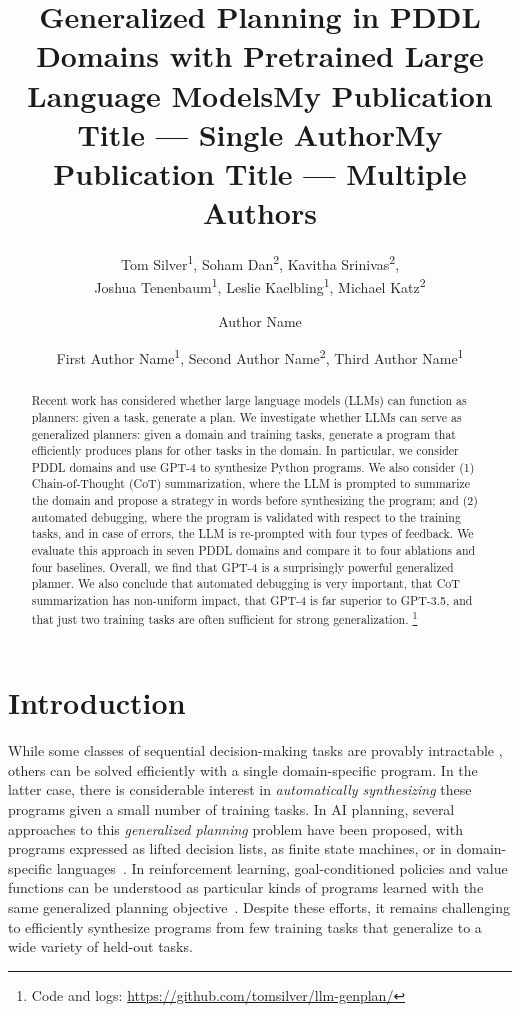 \documentclass[letterpaper]{article} %
\title{Generalized Planning in PDDL Domains with Pretrained Large Language Models}
\author{
    Tom Silver\textsuperscript{\rm 1},
    Soham Dan\textsuperscript{\rm 2},
    Kavitha Srinivas\textsuperscript{\rm 2},\\
    Joshua Tenenbaum\textsuperscript{\rm 1},
    Leslie Kaelbling\textsuperscript{\rm 1},
    Michael Katz\textsuperscript{\rm 2}
}
\title{My Publication Title --- Single Author}
\author {
    Author Name
}
\title{My Publication Title --- Multiple Authors}
\author {
    First Author Name\textsuperscript{\rm 1},
    Second Author Name\textsuperscript{\rm 2},
    Third Author Name\textsuperscript{\rm 1}
}
\begin{document}
\maketitle

\begin{abstract}
Recent work has considered whether large language models (LLMs) can function as planners: given a task, generate a plan.
We investigate whether LLMs can serve as generalized planners: given a domain and training tasks, generate a program that efficiently produces plans for other tasks in the domain.
In particular, we consider PDDL domains and use GPT-4 to synthesize Python programs.
We also consider (1) Chain-of-Thought (CoT) summarization, where the LLM is prompted to summarize the domain and propose a strategy in words before synthesizing the program; and (2) automated debugging, where the program is validated with respect to the training tasks, and in case of errors, the LLM is re-prompted with four types of feedback.
We evaluate this approach in seven PDDL domains and compare it to four ablations and four baselines.
Overall, we find that GPT-4 is a surprisingly powerful generalized planner.
We also conclude that automated debugging is very important, that CoT summarization has non-uniform impact, that GPT-4 is far superior to GPT-3.5, and that just two training tasks are often sufficient for strong generalization.
\footnote{Code and logs: \url{https://github.com/tomsilver/llm-genplan/}}
\end{abstract}

\section{Introduction}


While some classes of sequential decision-making tasks are provably intractable \cite{chapman-aij1987}, others can be solved efficiently with a single domain-specific program.
In the latter case, there is considerable interest in \emph{automatically synthesizing} these programs given a small number of training tasks.
In AI planning, several approaches to this \emph{generalized planning} problem have been proposed, with programs expressed as lifted decision lists, as finite state machines, or in domain-specific languages~\cite{srivastava2011foundations,bonet2015policies,jimenez2019review,rivlin2020generalized}.
In reinforcement learning, goal-conditioned policies and value functions can be understood as particular kinds of programs learned with the same generalized planning objective~\cite{gcrl1,gcrl2}.
Despite these efforts, it remains challenging to efficiently synthesize programs from few training tasks that generalize to a wide variety of held-out tasks. 
\end{document}

